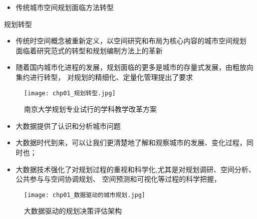 \begin{frame}[t]{\subsecname}
\begin{itemize}
\item 传统城市空间规划面临方法转型
\end{itemize}

\begin{commonbox}{规划转型} 
\begin{itemize} 
\item 传统时空间概念被重新定义，以空间研究和布局为核心内容的城市空间规划
面临着研究范式的转型和规划编制方法上的革新
\item 随着国内城市化进程的发展，规划面临的更多是城市的存量式发展，由粗放向集约进行转型，
对规划的精细化、定量化管理提出了要求
\end{itemize}
\end{commonbox}
\begin{figure}
  \centering
  \texttt{[image: chp01\_规划转型.jpg]}
  \caption{南京大学规划专业试行的学科教学改革方案}
\end{figure}
\end{frame}

\begin{frame}[t]{\subsecname}
\begin{itemize}
\item 大数据提供了认识和分析城市问题
\item 大数据时代到来，可以让我们更清楚地了解和观察城市的发展、变化过程，同时也；
\item 大数据技术强化了对规划过程的重视和科学化,尤其是对规划调研、空间分析、公共参与与空间协调规划、
空间预测和可视化等过程的科学把握，
\end{itemize}
\begin{figure}
  \centering
  \texttt{[image: chp01\_数据驱动的城市规划.jpg]}
  \caption{大数据驱动的规划决策评估架构}
\end{figure}
\end{frame}